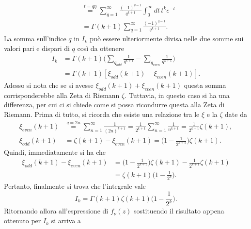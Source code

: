 \begin{caso}
\begin{equation}
\begin{split}
            &\overset{t = q\eta}{=}\sum_{q=1}^\infty \frac{(-1)^{q-1}}{q^{k+1}} \int_0^\infty dt\,t^ke^{-t} \\
            &= \Gamma(k+1)\sum_{q=1}^\infty \frac{(-1)^{q-1}}{q^{k+1}}.
        \end{split}
    \end{equation}
    La somma sull'indice $q$ in $I_k$ può essere ulteriormente divisa nelle due somme sui valori pari e dispari di $q$ così da ottenere
    \begin{equation}
        \begin{split}
            I_k &= \Gamma(k+1)\bigg(\sum_{q_{odd}}\frac{1}{q^{k+1}} - \sum_{q_{even}}\frac{1}{q^{k+1}}\bigg) \\
            &= \Gamma(k +1)[\xi_{odd}(k+1) - \xi_{even}(k+1)].
        \end{split}
    \end{equation}
    Adesso si nota che se si avesse $\xi_{odd}(k+1) + \xi_{even}(k+1)$ questa somma corrisponderebbe alla Zeta di Riemann $\zeta$. Tuttavia, in questo caso si ha una differenza, per cui ci si chiede come si possa ricondurre questa alla Zeta di Riemann. Prima di tutto, si ricorda che esiste una relazione tra le $\xi$ e la $\zeta$ date da
    \begin{align}
        \xi_{even}(k+1) &\overset{q = 2n}{=} \sum_{n = 1}^\infty\frac{1}{(2n)^{k+1}} = \frac{1}{2^{k+1}}\sum_{n=1}^\infty\frac{1}{n^{k+1}} = \frac{1}{2^{k+1}}\zeta(k+1), \\
        \xi_{odd}(k+1) &= \zeta(k+1) - \xi_{even}(k+1) = \bigg(1 - \frac{1}{2^{k+1}}\bigg)\zeta(k+1).
    \end{align}
    Quindi, immediatamente si ha che
    \begin{equation}
        \begin{split}
            \xi_{odd}(k+1) - \xi_{even}(k+1) &= \bigg(1 - \frac{1}{2^{k+1}}\bigg)\zeta(k+1) - \frac{1}{2^{k+1}}\zeta(k+1) \\
            &= \zeta(k+1)\bigg(1 - \frac{1}{2^k}\bigg).
        \end{split}
    \end{equation}
    Pertanto, finalmente si trova che l'integrale vale
    \begin{equation}
        I_k = \Gamma(k+1)\zeta(k+1)\bigg(1 - \frac{1}{2^k}\bigg).
    \end{equation}
    Ritornando allora all'espressione di $f_\nu(z)$ sostituendo il risultato appena ottenuto per $I_k$ si arriva a 
    \begin{equation}

\end{equation}
\end{caso}
